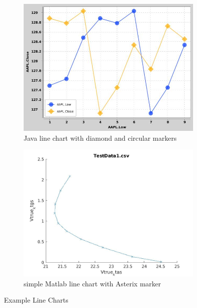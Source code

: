 \documentclass[12pt, a4paper,oneside]{report}
\begin{document}
\begin{figure}[!htbp]
	\begin{subfigure}{.5\textwidth}
		\centering
		\includegraphics[width=.8\linewidth]{line1}
		\caption{Java line chart with diamond and circular markers }
		\label{fig:line1}
	\end{subfigure}%
	\begin{subfigure}{.5\textwidth}
		\centering
		\includegraphics[width=.8\linewidth]{line2}
		\caption{simple Matlab line chart with Asterix marker}
		\label{fig:line2}
	\end{subfigure}
	\caption{Example Line Charts}
	\label{fig:figline}
\end{figure}
\end{document}
